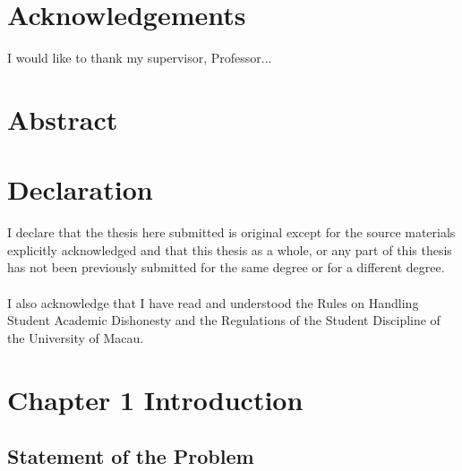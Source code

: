 \documentclass[a4paper, 12pt, twoside]{article}
\begin{document}
\restoregeometry
\setcounter{page}{1}
\section*{Acknowledgements}

I would like to thank my supervisor, Professor... \\
\lipsum[1]
\newpage

\section*{Abstract}
\lipsum[2]
\newpage

\section*{Declaration}
I declare that the thesis here submitted is original except for the source materials explicitly acknowledged  and that this thesis as a whole, or any part of this thesis has not been previously submitted for the same degree or for a different degree.\\ \\ 
I also acknowledge that I have read and understood the Rules on Handling Student Academic Dishonesty and the Regulations of the Student Discipline of the University of Macau.

\newpage
\renewcommand\contentsname{Table of Contents}
\tableofcontents
\newpage
\listoffigures 
\newpage
\listoftables

\newpage 
\setcounter{page}{1}
\section*{Chapter 1 Introduction}
\label{sec:intro}
\lipsum[2]
\setcounter{section}{1}
\subsection{Statement of the Problem}
\lipsum[1]
\end{document}
